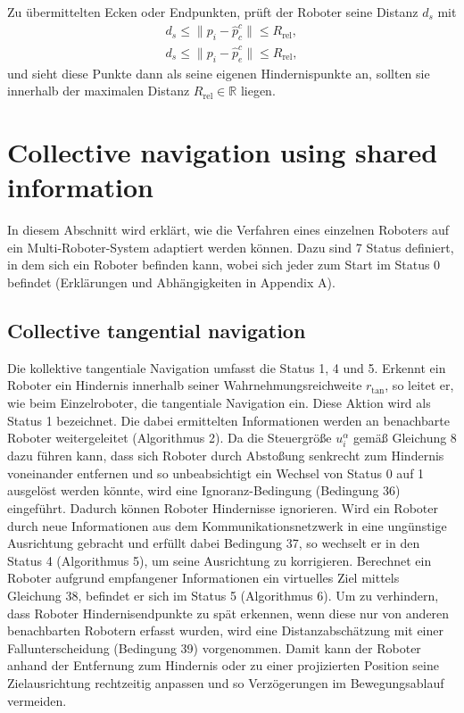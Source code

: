 \documentclass[conference]{IEEEtran}
\begin{document}
Zu übermittelten Ecken oder Endpunkten, prüft der Roboter seine Distanz $d_s$ mit
\begin{align}
d_s \leq \| p_i - \hat{p}_c^c \| \leq R_{\mathrm{rel}},\\
d_s \leq \| p_i - \hat{p}_e^c \| \leq R_{\mathrm{rel}},
\end{align}
und sieht diese Punkte dann als seine eigenen Hindernispunkte an, sollten 
sie innerhalb der maximalen Distanz \( R_{\mathrm{rel}} \in \mathbb{R} \) liegen.


\section{Collective navigation using shared information}
In diesem Abschnitt wird erklärt, wie die Verfahren eines einzelnen Roboters auf ein 
Multi-Roboter-System adaptiert werden können. Dazu sind 7 Status definiert, in dem 
sich ein Roboter befinden kann, wobei sich jeder zum Start im Status 0 befindet 
(Erklärungen und Abhängigkeiten in Appendix A).

\subsection*{Collective tangential navigation}
Die kollektive tangentiale Navigation umfasst die Status 1, 4 und 5. Erkennt ein 
Roboter ein Hindernis innerhalb seiner Wahrnehmungsreichweite \( r_{\mathrm{tan}} \), so leitet er, 
wie beim Einzelroboter, die tangentiale Navigation ein. Diese Aktion wird als 
Status 1 bezeichnet. Die dabei ermittelten Informationen werden an benachbarte 
Roboter weitergeleitet (Algorithmus 2).
Da die Steuergröße \( u_i^\alpha \) gemäß Gleichung 8 dazu führen kann, dass sich Roboter 
durch Abstoßung senkrecht zum Hindernis voneinander entfernen und so unbeabsichtigt 
ein Wechsel von Status 0 auf 1 ausgelöst werden könnte, wird eine Ignoranz-Bedingung 
(Bedingung 36) eingeführt. Dadurch können Roboter Hindernisse ignorieren.
Wird ein Roboter durch neue Informationen aus dem Kommunikationsnetzwerk in eine 
ungünstige Ausrichtung gebracht und erfüllt dabei Bedingung 37, so wechselt er in 
den Status 4 (Algorithmus 5), um seine Ausrichtung zu korrigieren.
Berechnet ein Roboter aufgrund empfangener Informationen ein virtuelles Ziel mittels 
Gleichung 38, befindet er sich im Status 5 (Algorithmus 6).
Um zu verhindern, dass Roboter Hindernisendpunkte zu spät erkennen, wenn diese nur 
von anderen benachbarten Robotern erfasst wurden, wird eine Distanzabschätzung mit 
einer Fallunterscheidung (Bedingung 39) vorgenommen. Damit kann der Roboter anhand 
der Entfernung zum Hindernis oder zu einer projizierten Position seine 
Zielausrichtung rechtzeitig anpassen und so Verzögerungen im Bewegungsablauf vermeiden.
\end{document}
